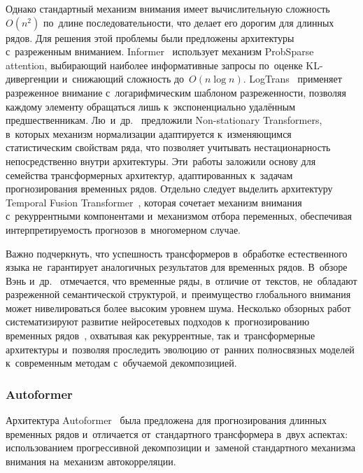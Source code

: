 Однако стандартный механизм внимания имеет вычислительную сложность
$O(n^2)$ по~длине последовательности, что делает его дорогим для
длинных рядов.  Для решения этой проблемы были предложены архитектуры
с~разреженным вниманием.  Informer~\cite{zhou2021informer} использует
механизм ProbSparse attention, выбирающий наиболее информативные запросы
по~оценке KL-дивергенции и~снижающий сложность до~$O(n \log n)$.
LogTrans~\cite{li2019enhancing} применяет разреженное внимание
с~логарифмическим шаблоном разреженности, позволяя каждому элементу
обращаться лишь к~экспоненциально удалённым предшественникам.
Лю~и~др.~\cite{liu2022nonstationary} предложили Non-stationary Transformers,
в~которых механизм нормализации адаптируется к~изменяющимся статистическим
свойствам ряда, что позволяет учитывать нестационарность непосредственно
внутри архитектуры.  Эти~работы заложили основу для семейства трансформерных
архитектур, адаптированных к~задачам прогнозирования временных рядов.
Отдельно следует выделить архитектуру Temporal Fusion
Transformer~\cite{lim2021temporal}, которая сочетает механизм внимания
с~рекуррентными компонентами и~механизмом отбора переменных, обеспечивая
интерпретируемость прогнозов в~многомерном случае.

Важно подчеркнуть, что успешность трансформеров в~обработке
естественного языка не~гарантирует аналогичных результатов для временных
рядов.  В~обзоре Вэнь и~др.~\cite{wen2023transformers} отмечается, что
временные ряды, в~отличие от~текстов, не~обладают разреженной
семантической структурой, и~преимущество глобального внимания может
нивелироваться более высоким уровнем шума.  Несколько обзорных работ
систематизируют развитие нейросетевых подходов к~прогнозированию
временных рядов~\cite{lim2021survey, torres2021deep, benidis2022deep,
wen2023transformers, hewamalage2021recurrent}, охватывая как
рекуррентные, так и~трансформерные архитектуры и~позволяя проследить
эволюцию от~ранних полносвязных моделей к~современным методам
с~обучаемой декомпозицией.


\subsubsection{Autoformer}
\label{sssec:autoformer}

Архитектура Autoformer~\cite{wu2021autoformer} была предложена для
прогнозирования длинных временных рядов и~отличается от~стандартного
трансформера в~двух аспектах: использованием прогрессивной декомпозиции
и~заменой стандартного механизма внимания на~механизм автокорреляции.

